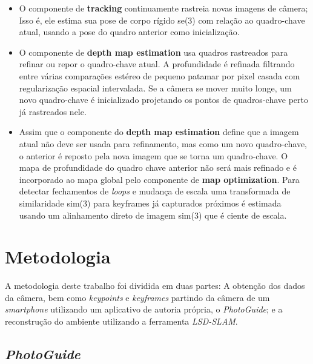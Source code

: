 \begin{itemize}
	\item{O componente de \textbf{tracking} continuamente rastreia novas imagens de câmera; Isso é, ele estima sua pose de corpo rígido   se(3) com relação ao quadro-chave atual, usando a pose do quadro anterior como inicialização.}
	\item{O componente de \textbf{depth map estimation} usa quadros rastreados para refinar ou repor o quadro-chave atual. A profundidade é refinada filtrando entre várias comparações estéreo de pequeno patamar por pixel casada com regularização espacial intervalada. Se a câmera se mover muito longe, um novo quadro-chave é inicializado projetando os pontos de quadros-chave perto já rastreados nele.}
	\item{Assim que o componente do \textbf{depth map estimation} define que a imagem atual não deve ser usada para refinamento, mas como um novo quadro-chave, o anterior é reposto pela nova imagem que se torna um quadro-chave. O mapa de profundidade do quadro chave anterior não será mais refinado e é incorporado ao mapa global pelo componente de \textbf{map optimization}. Para detectar fechamentos de \textit{loops} e mudança de escala uma transformada de similaridade   sim(3) para keyframes já capturados próximos é estimada usando um alinhamento direto de imagem sim(3) que é ciente de escala.}
\end{itemize}

\chapter{Metodologia}

A metodologia deste trabalho foi dividida em duas partes: A obtenção dos dados da câmera, bem como \textit{keypoints} e \textit{keyframes} partindo da câmera de um \textit{smartphone} utilizando um aplicativo de autoria própria, o \textit{PhotoGuide}; e a reconstrução do ambiente utilizando a ferramenta \textit{LSD-SLAM}.


\section{\textit{PhotoGuide}}

